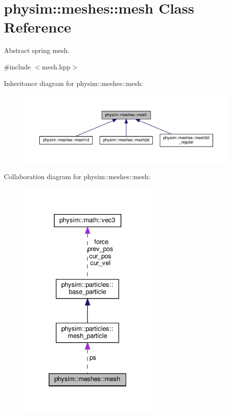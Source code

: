 \hypertarget{classphysim_1_1meshes_1_1mesh}{}\section{physim\+:\+:meshes\+:\+:mesh Class Reference}
\label{classphysim_1_1meshes_1_1mesh}


Abstract spring mesh.  




{\ttfamily \#include $<$mesh.\+hpp$>$}



Inheritance diagram for physim\+:\+:meshes\+:\+:mesh\+:\nopagebreak
\begin{figure}[H]
\begin{center}
\leavevmode
\includegraphics[width=350pt]{classphysim_1_1meshes_1_1mesh__inherit__graph}
\end{center}
\end{figure}


Collaboration diagram for physim\+:\+:meshes\+:\+:mesh\+:\nopagebreak
\begin{figure}[H]
\begin{center}
\leavevmode
\includegraphics[width=199pt]{classphysim_1_1meshes_1_1mesh__coll__graph}
\end{center}
\end{figure}
